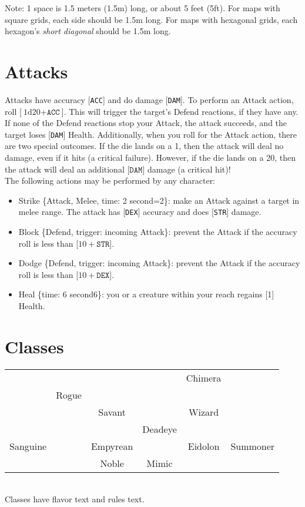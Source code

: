 \documentclass[12pt]{article}
\newcommand{\STR}{\texttt{STR}}
\newcommand{\DEX}{\texttt{DEX}}
\newcommand{\ACC}{\texttt{ACC}}
\newcommand{\DAM}{\texttt{DAM}}
\newcommand{\TIME}[1]{\{time: #1 second\if1#1{}\else{s}\fi\}}
\newcommand{\MELEE}[1]{\{Attack, Melee, time: #1 second\if1=#1{}\else{s}\fi\}}
\newcommand{\DEFEND}{\{Defend, trigger: incoming Attack\}}
\newcommand{\dice}[2]{\text{#1d#2}}
\begin{document}
Note: 1 space is 1.5 meters (1.5m) long, or about 5 feet (5ft). For maps with square grids, each side should be 1.5m long. For maps with hexagonal grids, each hexagon’s \textit{short diagonal} should be 1.5m long.

\pagebreak
\section{Attacks}

Attacks have accuracy [\ACC] and do damage [\DAM]. To perform an Attack action, roll [$\dice{1}{20} + \ACC$]. This will trigger the target’s Defend reactions, if they have any. If none of the Defend reactions stop your Attack, the attack succeeds, and the target loses [\DAM] Health. Additionally, when you roll for the Attack action, there are two special outcomes. If the die lands on a 1, then the attack will deal no damage, even if it hits (a critical failure). However, if the die lands on a 20, then the attack will deal an additional [$\DAM$] damage (a critical hit)!
\\[5mm]
The following actions may be performed by any character:
\begin{itemize}

\item Strike \MELEE{2}: make an Attack against a target in melee range. The attack has [\DEX] accuracy and does [\STR] damage.

\item Block \DEFEND: prevent the Attack if the accuracy roll is less than [$10 + \STR$].

\item Dodge \DEFEND: prevent the Attack if the accuracy roll is less than [$10 + \DEX$].

\item Heal \TIME{6}: you or a creature within your reach regains [1] Health.

\end{itemize}

\pagebreak
\section{Classes}

\begin{tabularx}{\textwidth}{CCCCCC}
 &  &  &  & Chimera &  \\
 & Rogue &  &  &  &  \\
 &  & Savant &  & Wizard &  \\
 &  &  & Deadeye &  &   \\
Sanguine &  & Empyrean &  & Eidolon & Summoner \\
 &  & Noble & Mimic &  &  \\
\end{tabularx}
\\[5mm]
Classes have flavor text and rules text.
\end{document}
